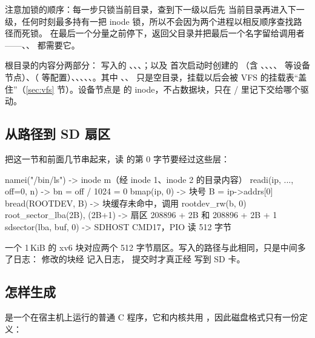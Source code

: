 注意加锁的顺序：每一步只锁当前目录，查到下一级以后先  当前目录再进入下一级，任何时刻最多持有一把 inode 锁，所以不会因为两个进程以相反顺序查找路径而死锁。 在最后一个分量之前停下，返回父目录并把最后一个名字留给调用者——、、 都需要它。

根目录的内容分两部分： 写入的 、、、；以及  首次启动时创建的 （含 、、、、 等设备节点）、（ 等配置）、、、、、。其中 、、 只是空目录，挂载以后会被 VFS 的挂载表“盖住”（\ref{sec:vfs} 节）。设备节点是  的 inode，不占数据块，只在 / 里记下交给哪个驱动。

\subsection{从路径到 SD 扇区}

把这一节和前面几节串起来，读  的第 0 字节要经过这些层：

\begin{txtcode}
namei("/bin/ls")             -> inode m（经 inode 1、inode 2 的目录内容）
readi(ip, ..., off=0, n)     -> bn = off / 1024 = 0
bmap(ip, 0)                  -> 块号 B = ip->addrs[0]
bread(ROOTDEV, B)            -> 块缓存未命中，调用 rootdev_rw(b, 0)
root_sector_lba(2B), (2B+1)  -> 扇区 208896 + 2B 和 208896 + 2B + 1
sdsector(lba, buf, 0)        -> SDHOST CMD17，PIO 读 512 字节
\end{txtcode}

一个 1\,KiB 的 xv6 块对应两个 512 字节扇区。写入的路径与此相同，只是中间多了日志： 修改的块经  记入日志， 提交时才真正经  写到 SD 卡。

\subsection{ 怎样生成 }

 是一个在宿主机上运行的普通 C 程序，它和内核共用 ，因此磁盘格式只有一份定义：

